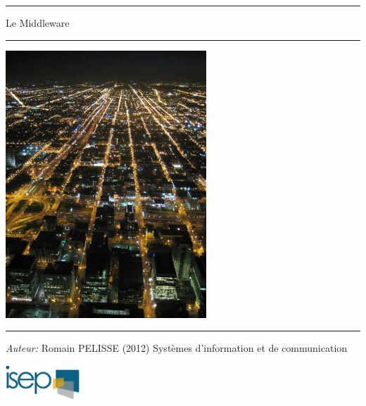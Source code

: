 \begin{titlepage}


\begin{center}
\vspace{20pt}
\hrule
\vspace{12pt}

\begin{center}
{ \huge Le Middleware}
\end{center}

\vspace{10pt}

\begin{center}
{ \Large \booktitle}
\end{center}
\vspace{3pt}
\hrule
\vspace{12pt}
\begin{center}
 \includegraphics[height=380px]{../img/cover-chicago-by-night.jpg}
\end{center}
\vfill
\hrule
\vspace{10pt}

\begin{minipage}{0.7\textwidth}
\begin{flushleft} \large
\emph{Auteur:} Romain PELISSE (2012)
\newline
Systèmes d'information et de communication
\end{flushleft}
\end{minipage}
\begin{minipage}{0.2\textwidth}
\begin{flushright} \large
  \includegraphics[height=50px]{../img/isep-logo.png}
\end{flushright}
\end{minipage}
\end{center}
\end{titlepage}

